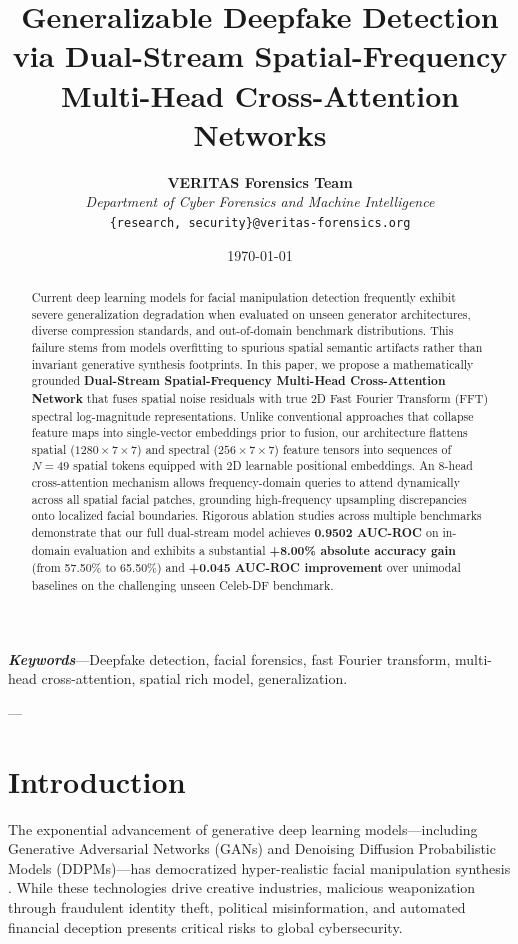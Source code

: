 \documentclass[journal,10pt,twocolumn]{article}
\title{\textbf{Generalizable Deepfake Detection via Dual-Stream Spatial-Frequency Multi-Head Cross-Attention Networks}}
\author{
    \textbf{VERITAS Forensics Team}\\
    \textit{Department of Cyber Forensics and Machine Intelligence}\\
    \texttt{\{research, security\}@veritas-forensics.org}
}
\date{\today}
\begin{document}
\maketitle

\begin{abstract}
Current deep learning models for facial manipulation detection frequently exhibit severe generalization degradation when evaluated on unseen generator architectures, diverse compression standards, and out-of-domain benchmark distributions. This failure stems from models overfitting to spurious spatial semantic artifacts rather than invariant generative synthesis footprints. In this paper, we propose a mathematically grounded \textbf{Dual-Stream Spatial-Frequency Multi-Head Cross-Attention Network} that fuses spatial noise residuals with true 2D Fast Fourier Transform (FFT) spectral log-magnitude representations. Unlike conventional approaches that collapse feature maps into single-vector embeddings prior to fusion, our architecture flattens spatial ($1280 \times 7 \times 7$) and spectral ($256 \times 7 \times 7$) feature tensors into sequences of $N=49$ spatial tokens equipped with 2D learnable positional embeddings. An 8-head cross-attention mechanism allows frequency-domain queries to attend dynamically across all spatial facial patches, grounding high-frequency upsampling discrepancies onto localized facial boundaries. Rigorous ablation studies across multiple benchmarks demonstrate that our full dual-stream model achieves \textbf{0.9502 AUC-ROC} on in-domain evaluation and exhibits a substantial \textbf{+8.00\% absolute accuracy gain} (from 57.50\% to 65.50\%) and \textbf{+0.045 AUC-ROC improvement} over unimodal baselines on the challenging unseen Celeb-DF benchmark.
\end{abstract}

\textbf{\textit{Keywords}}---Deepfake detection, facial forensics, fast Fourier transform, multi-head cross-attention, spatial rich model, generalization.

---

\section{Introduction}
\label{sec:intro}

The exponential advancement of generative deep learning models---including Generative Adversarial Networks (GANs) and Denoising Diffusion Probabilistic Models (DDPMs)---has democratized hyper-realistic facial manipulation synthesis \cite{verdoliva2020media}. While these technologies drive creative industries, malicious weaponization through fraudulent identity theft, political misinformation, and automated financial deception presents critical risks to global cybersecurity.
\end{document}
